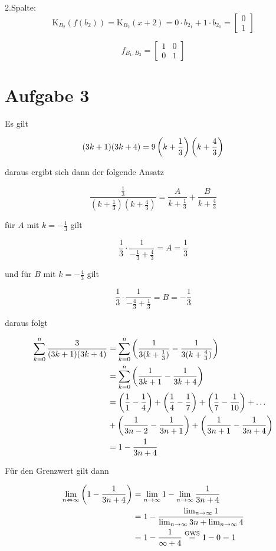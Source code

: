 \documentclass[a4paper, 11pt]{article}
\begin{document}
2.Spalte:
$$ \text{K}_{B_2}(f(b_2)) = \text{K}_{B_2}(x + 2) = 0 \cdot b_{2_1} + 1 \cdot b_{2_0} = \begin{bmatrix} 0 \\ 1 \end{bmatrix}$$

$$ f_{B_1,B_2} = \begin{bmatrix} 1 & 0 \\ 0 & 1 \end{bmatrix}$$

\section{Aufgabe 3}
\label{sec:orgd9b7002}
Es gilt

$$ (3k + 1)(3k + 4) =
    9 \left(k + \frac{1}{3}\right) \left(k + \frac{4}{3}\right) $$

daraus ergibt sich dann der folgende Ansatz

$$ \frac{\frac{1}{3}}{(k + \frac{1}{3})(k + \frac{4}{3})} =
    \frac{A}{k + \frac{1}{3}} +
    \frac{B}{k + \frac{4}{3}} $$

für \(A\) mit \(k = -\frac{1}{3}\) gilt

$$ \frac{1}{3} \cdot \frac{1}{-\frac{1}{3} + \frac{4}{3}} = A = \frac{1}{3} $$

und für \(B\) mit \(k = -\frac{4}{3}\) gilt

$$ \frac{1}{3} \cdot \frac{1}{-\frac{4}{3} + \frac{1}{3}} = B = -\frac{1}{3} $$

\pagebreak

daraus folgt

\begin{align*}
    \sum_{k = 0}^{n} \frac{3}{(3k + 1)(3k + 4)} &=
        \sum_{k = 0}^{n} \left( \frac{1}{3(k + \frac{1}{3})} -
            \frac{1}{3(k + \frac{4}{3})} \right) \\
    &= \sum_{k = 0}^{n} \left( \frac{1}{3k + 1} - \frac{1}{3k + 4} \right) \\
    &= \left(\frac{1}{1} - \frac{1}{4}\right) +
        \left(\frac{1}{4} - \frac{1}{7}\right) +
        \left(\frac{1}{7} - \frac{1}{10}\right) + \dots \\
        &+ \left( \frac{1}{3n - 2} - \frac{1}{3n + 1} \right) +
        \left( \frac{1}{3n + 1} - \frac{1}{3n + 4} \right) \\
    &= 1 - \frac{1}{3n + 4}
\end{align*}

Für den Grenzwert gilt dann

\begin{align*}
    \lim_{n \Leftrightarrow \infty} \left(1 - \frac{1}{3n + 4}\right) &=
        \lim_{n \rightarrow \infty} 1 -
            \lim_{n \rightarrow \infty} \frac{1}{3n + 4} \\
    &= 1 - \frac{\lim_{n \rightarrow \infty} 1}{\lim_{n \rightarrow \infty} 3n +
            \lim_{n \rightarrow \infty} 4} \\
    &= 1 - \frac{1}{\infty + 4} \overset{\text{GWS}}{=} 1 - 0 = 1
\end{align*}
\end{document}
